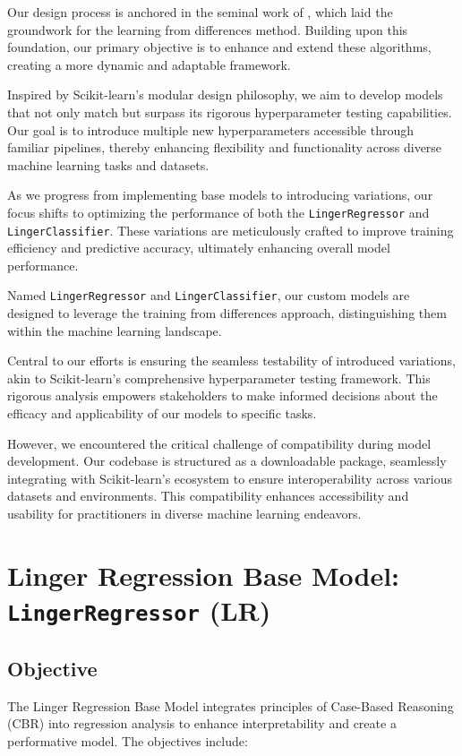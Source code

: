 \documentclass[a4paper, 12pt]{report}
\begin{document}
Our design process is anchored in the seminal work of \cite{learningFromDifferences2022}, which laid the groundwork for the learning from differences method. 
Building upon this foundation, our primary objective is to enhance and extend these algorithms, creating a more dynamic and adaptable framework.

Inspired by Scikit-learn's modular design philosophy, we aim to develop models that not only match but surpass its rigorous hyperparameter testing capabilities. 
Our goal is to introduce multiple new hyperparameters accessible through familiar pipelines, thereby enhancing flexibility and functionality across diverse 
machine learning tasks and datasets.

As we progress from implementing base models to introducing variations, our focus shifts to optimizing the performance of 
both the \texttt{LingerRegressor} and \texttt{LingerClassifier}. These variations are meticulously crafted to improve training efficiency and predictive accuracy, 
ultimately enhancing overall model performance.

Named \texttt{LingerRegressor} and \texttt{LingerClassifier}, our custom models are designed to leverage the training from differences approach, 
distinguishing them within the machine learning landscape.

Central to our efforts is ensuring the seamless testability of introduced variations, akin to Scikit-learn's comprehensive hyperparameter testing framework. 
This rigorous analysis empowers stakeholders to make informed decisions about the efficacy and applicability of our models to specific tasks.

However, we encountered the critical challenge of compatibility during model development. Our codebase is structured as a downloadable package, 
seamlessly integrating with Scikit-learn's ecosystem to ensure interoperability across various datasets and environments. 
This compatibility enhances accessibility and usability for practitioners in diverse machine learning endeavors.

\section{Linger Regression Base Model: \texttt{LingerRegressor} (LR)}
\label{sec:linger_regression_base_model}
\subsection{Objective}
The Linger Regression Base Model integrates principles of Case-Based Reasoning (CBR) into regression analysis to enhance interpretability and create a performative model. The objectives include:
\end{document}

